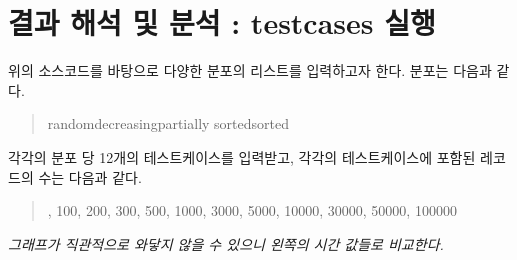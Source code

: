 \documentclass{article}
\begin{document}
\section{결과 해석 및 분석 : testcases 실행}
위의 소스코드를 바탕으로 다양한 분포의 리스트를 입력하고자 한다.
분포는 다음과 같다.
\begin{quote}\centering
    random\;\;\;\;decreasing\;\;\;\;partially sorted\;\;\;\;sorted
\end{quote}
각각의 분포 당 12개의 테스트케이스를 입력받고, 각각의 테스트케이스에 포함된 레코드의 수는 다음과 같다.
\begin{quote}, 100, 200, 300, 500, 1000, 3000, 5000, 10000, 30000, 50000, 100000
\end{quote}
\textit{그래프가 직관적으로 와닿지 않을 수 있으니 왼쪽의 시간 값들로 비교한다.}

\end{document}
